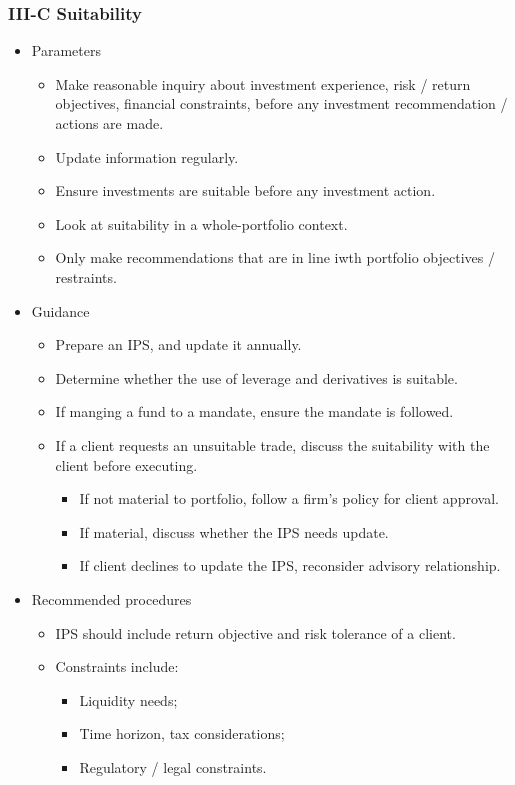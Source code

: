 \documentclass[../notes_compiled.tex]{subfiles}
\begin{document}
\subsubsection{III-C Suitability}
\begin{itemize}
\item Parameters
\begin{itemize}
\item Make reasonable inquiry about investment experience, risk / return objectives, financial constraints, before any investment recommendation / actions are made.
\item Update information regularly.
\item Ensure investments are suitable before any investment action.
\item Look at suitability in a whole-portfolio context.
\item Only make recommendations that are in line iwth portfolio objectives / restraints.
\end{itemize}
\item Guidance
\begin{itemize}
\item Prepare an IPS, and update it annually.
\item Determine whether the use of leverage and derivatives is suitable.
\item If manging a fund to a mandate, ensure the mandate is followed.
\item If a client requests an unsuitable trade, discuss the suitability with the client before executing.
\begin{itemize}
\item If not material to portfolio, follow a firm’s policy for client approval.
\item If material, discuss whether the IPS needs update.
\item If client declines to update the IPS, reconsider advisory relationship.
\end{itemize}
\end{itemize}
\item Recommended procedures
\begin{itemize}
\item IPS should include return objective and risk tolerance of a client.
\item Constraints include:
\begin{itemize}
\item Liquidity needs;
\item Time horizon, tax considerations;
\item Regulatory / legal constraints.
\end{itemize}
\end{itemize}
\end{itemize}
\end{document}
